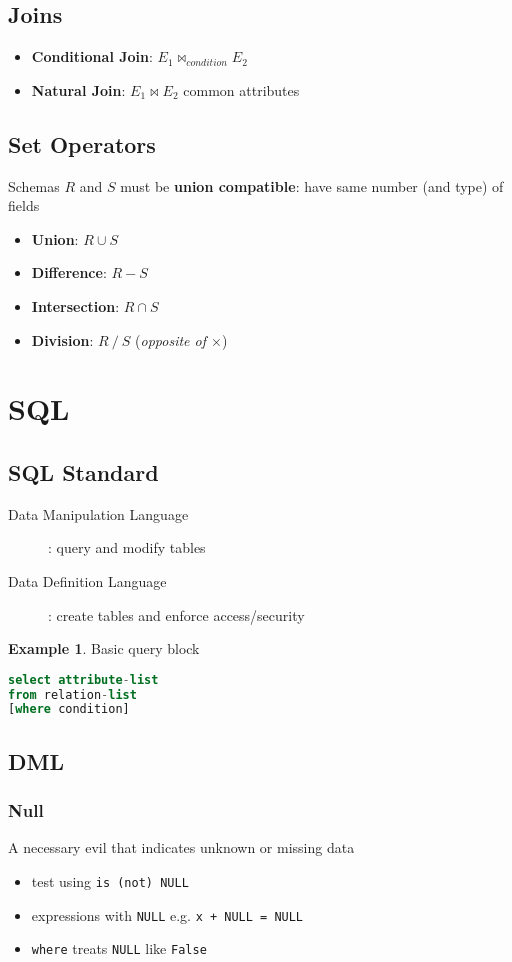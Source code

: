 \documentclass[]{article}
\theoremstyle{definition}
\newtheorem{ex}{Example}[section]
\begin{document}
		\subsection{Joins}
			\begin{itemize}
				\item \textbf{Conditional Join}: $E_1 \Join_{condition} E_2$
				\item \textbf{Natural Join}: $E_1 \Join E_2$ common attributes
			\end{itemize}			
		\subsection{Set Operators}
			Schemas $R$ and $S$ must be \textbf{union compatible}: have same number (and type) of fields
			\begin{itemize}
				\item \textbf{Union}: $R \cup S$
				\item \textbf{Difference}: $R - S$
				\item \textbf{Intersection}: $R \cap S$
				\item \textbf{Division}: $R \mathbin{/} S$ (\textit{opposite of $\times$})
			\end{itemize}															
	\section{SQL}
		\subsection{SQL Standard}
			\begin{description}
				\item[Data Manipulation Language]: query and modify tables
				\item[Data Definition Language]: create tables and enforce access/security
			\end{description}				
			\begin{ex}
				Basic query block
				\begin{lstlisting}[language=SQL]
select attribute-list
from relation-list
[where condition]
				\end{lstlisting}
			\end{ex}			
		\subsection{DML}
			\subsubsection{Null}
				A necessary evil that indicates unknown or missing data
				\begin{itemize}
					\item test using \lstinline|is (not) NULL|
					\item expressions with \lstinline|NULL| e.g. \lstinline|x + NULL = NULL|
					\item \lstinline|where| treats \lstinline|NULL| like \lstinline|False|
				\end{itemize}
\end{document}
